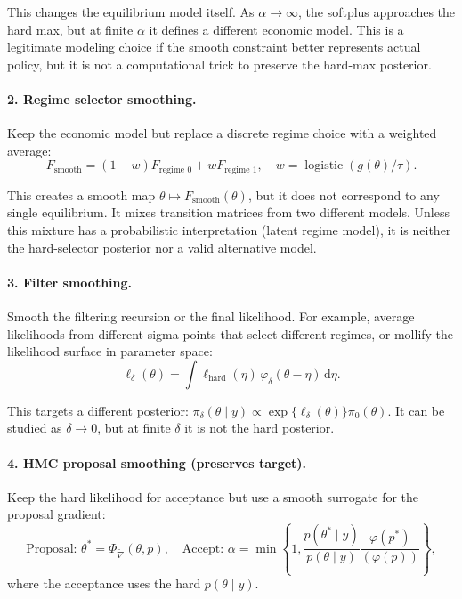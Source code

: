 This changes the equilibrium model itself. As $\alpha \to \infty$, the
softplus approaches the hard max, but at finite $\alpha$ it defines a
different economic model. This is a legitimate modeling choice if the
smooth constraint better represents actual policy, but it is not a
computational trick to preserve the hard-max posterior.

\paragraph{2. Regime selector smoothing.}
Keep the economic model but replace a discrete regime choice with a weighted
average:
\begin{equation}
  F_{\text{smooth}} = (1 - w) F_{\text{regime 0}} + w F_{\text{regime 1}},
  \quad w = \operatorname{logistic}(g(\theta) / \tau).
  \label{eq:soft-selector}
\end{equation}

This creates a smooth map $\theta \mapsto F_{\text{smooth}}(\theta)$, but it
does not correspond to any single equilibrium. It mixes transition matrices
from two different models. Unless this mixture has a probabilistic
interpretation (latent regime model), it is neither the hard-selector
posterior nor a valid alternative model.

\paragraph{3. Filter smoothing.}
Smooth the filtering recursion or the final likelihood. For example, average
likelihoods from different sigma points that select different regimes, or
mollify the likelihood surface in parameter space:
\begin{equation}
  \ell_\delta(\theta) = \int \ell_{\text{hard}}(\eta) \, \varphi_\delta(\theta - \eta) \, \mathrm{d}\eta.
  \label{eq:mollified-likelihood}
\end{equation}

This targets a different posterior:
$\pi_\delta(\theta \mid y) \propto \exp\{\ell_\delta(\theta)\} \pi_0(\theta)$.
It can be studied as $\delta \to 0$, but at finite $\delta$ it is not the
hard posterior.

\paragraph{4. HMC proposal smoothing (preserves target).}
Keep the hard likelihood for acceptance but use a smooth surrogate for the
proposal gradient:
\begin{equation}
  \text{Proposal: } \theta^* = \Phi_{\widetilde{\nabla}}(\theta, p),
  \quad
  \text{Accept: } \alpha = \min\left\{1, \frac{p(\theta^* \mid y)}{p(\theta \mid y)} \frac{\varphi(p^*)}{(\varphi(p))} \right\},
  \label{eq:surrogate-proposal}
\end{equation}
where the acceptance uses the hard $p(\theta \mid y)$.

